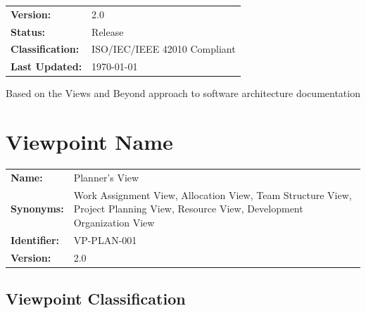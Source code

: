 \documentclass[11pt,letterpaper]{article}
\begin{document}
\begin{titlepage}
\begin{tikzpicture}[scale=0.65]
    \end{tikzpicture}
    
    \vspace{1.3cm}
    
    \begin{tabular}{ll}
        \textbf{Version:} & 2.0 \\
        \textbf{Status:} & Release \\
        \textbf{Classification:} & ISO/IEC/IEEE 42010 Compliant \\
        \textbf{Last Updated:} & \today \\
    \end{tabular}
    
    \vfill
    
    {\small Based on the Views and Beyond approach to software architecture documentation}
    
\end{titlepage}
\clearpage
\hypersetup{pageanchor=true}

\tableofcontents
\newpage

\section{Viewpoint Name}

\begin{definitionbox}
\begin{tabular}{@{}L{3.5cm}L{10cm}@{}}
\textbf{Name:} & Planner's View \\[0.5em]
\textbf{Synonyms:} & Work Assignment View, Allocation View, Team Structure View, Project Planning View, Resource View, Development Organization View \\[0.5em]
\textbf{Identifier:} & VP-PLAN-001 \\[0.5em]
\textbf{Version:} & 2.0 \\
\end{tabular}
\end{definitionbox}

\subsection{Viewpoint Classification}
\end{document}
